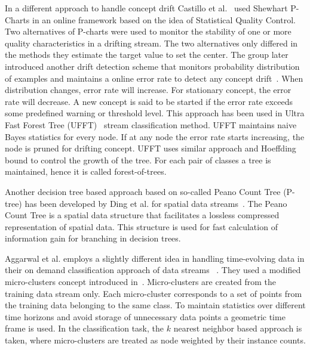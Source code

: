 In a different approach to handle concept drift Castillo et al.~\cite{gama03:drift} used Shewhart P-Charts in an online framework based on the idea of Statistical Quality Control. Two alternatives of P-charts were used to monitor the stability of one or more quality characteristics in a drifting stream. The two alternatives only differed in the methods they estimate the target value to set the center. The group later introduced another drift detection scheme that monitors probability distribution of examples and maintains a online error rate to detect any concept drift~\cite{gama04:drift}. When distribution changes, error rate will increase. For stationary concept, the error rate will decrease. A new concept is said to be started if the error rate exceeds some predefined warning or threshold level. This approach has been used in Ultra Fast Forest Tree (UFFT)~\cite{gama04:ft, gama05:ft} stream classification method. UFFT maintains naive Bayes statistics for every node. If at any node the error rate starts increasing, the node is pruned for drifting concept. UFFT uses similar approach and Hoeffding bound to control the growth of the tree. For each pair of classes a tree is maintained, hence it is called forest-of-trees.

Another decision tree based approach based on so-called Peano Count Tree (P-tree) has been developed by Ding et al. for spatial data streams~\cite{ding02:peanocount}. The Peano Count Tree is a spatial data structure that facilitates a lossless compressed representation of spatial data. This structure is used for fast calculation of information gain for branching in decision trees.

Aggarwal et al. employs a slightly different idea in handling time-evolving data in their on demand classification approach of data streams ~\cite{aggarwal04:ondemand}. They used a modified micro-clusters concept introduced in~\cite{aggarwal03:clustream}. Micro-clusters are created from the training data stream only. Each micro-cluster corresponds to a set of points from the training data belonging to the same class. To maintain statistics over different time horizons and avoid storage of unnecessary data points a geometric time frame is used. In the classification task, the $k$ nearest neighbor based approach is taken, where micro-clusters are treated as node weighted by their instance counts. 

